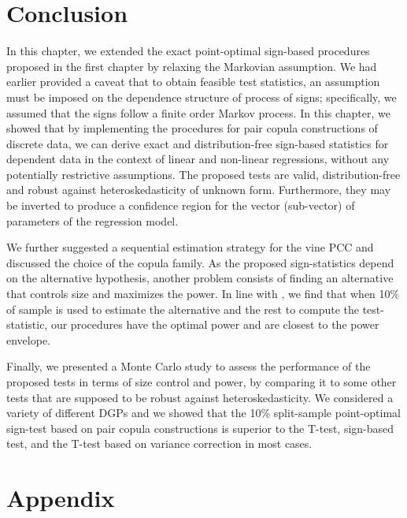\documentclass[harvard,11pt]{article}
\begin{document}
\section{Conclusion \label{ConclusionC3}}
In this chapter, we extended the exact point-optimal sign-based procedures proposed in the first chapter by relaxing the Markovian assumption. We had earlier provided a caveat that to obtain feasible test statistics, an assumption must be imposed on the dependence structure of process of signs; specifically, we assumed that the signs follow a finite order Markov process. In this chapter, we showed that by implementing the procedures for pair copula constructions of discrete data, we can derive exact and distribution-free sign-based statistics for dependent data in the context of linear and non-linear regressions, without any potentially restrictive assumptions. The proposed tests are valid, distribution-free and robust against heteroskedasticity of unknown form. Furthermore, they may be inverted to produce a confidence region for the vector (sub-vector) of parameters of the regression model. 

We further suggested a sequential estimation strategy for the vine PCC and discussed the choice of the copula family. As the proposed sign-statistics depend on the alternative hypothesis, another problem consists of finding an alternative that controls size and maximizes the power. In line with \citet{dufour2010exact}, we find that when 10\% of sample is used to estimate the alternative and the rest to compute the test-statistic, our procedures have the optimal power and are closest to the power envelope.

Finally, we presented a Monte Carlo study to assess the performance of the proposed tests in terms of size control and power, by comparing it to some other tests that are supposed to be robust against heteroskedasticity. We considered a variety of different DGPs and we showed that the 10\% split-sample point-optimal sign-test based on pair copula constructions is superior to the T-test, \citet{dufour1995exact} sign-based test,
and the T-test based on \citet{white1980heteroskedasticity} variance correction in most cases.
\newpage

\section{Appendix}
\end{document}
